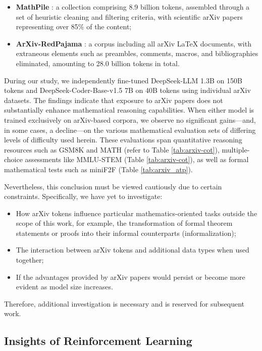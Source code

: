 \begin{itemize}[topsep=0pt]
\begin{itemize}[topsep=0pt]
\begin{itemize}[topsep=0pt]
    \item \textbf{MathPile} \citep{mathpile}: a collection comprising 8.9 billion tokens, assembled through a set of heuristic cleaning and filtering criteria, with scientific arXiv papers representing over 85\% of the content;
    \item \textbf{ArXiv-RedPajama} \citep{redpajama}: a corpus including all arXiv LaTeX documents, with extraneous elements such as preambles, comments, macros, and bibliographies eliminated, amounting to 28.0 billion tokens in total.
\end{itemize}

During our study, we independently fine-tuned DeepSeek-LLM 1.3B on 150B tokens and DeepSeek-Coder-Base-v1.5 7B on 40B tokens using individual arXiv datasets. The findings indicate that exposure to arXiv papers does not substantially enhance mathematical reasoning capabilities. When either model is trained exclusively on arXiv-based corpora, we observe no significant gains—and, in some cases, a decline—on the various mathematical evaluation sets of differing levels of difficulty used herein. These evaluations span quantitative reasoning resources such as GSM8K and MATH (refer to Table \ref{tab:arxiv-cot}), multiple-choice assessments like MMLU-STEM (Table \ref{tab:arxiv-cot}), as well as formal mathematical tests such as miniF2F (Table \ref{tab:arxiv_atp}).

Nevertheless, this conclusion must be viewed cautiously due to certain constraints. Specifically, we have yet to investigate:

\begin{itemize}[topsep=0pt]
    \item How arXiv tokens influence particular mathematics-oriented tasks outside the scope of this work, for example, the transformation of formal theorem statements or proofs into their informal counterparts (informalization);
    \item The interaction between arXiv tokens and additional data types when used together;
    \item If the advantages provided by arXiv papers would persist or become more evident as model size increases.
\end{itemize}

Therefore, additional investigation is necessary and is reserved for subsequent work.

\subsection{Insights of Reinforcement Learning}

\end{itemize}
\end{itemize}
